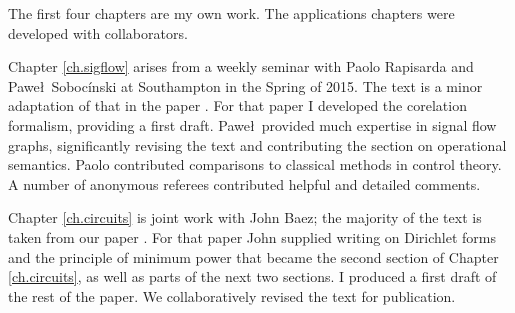 The first four chapters are my own work. The applications chapters were
developed with collaborators. 

Chapter \ref{ch.sigflow} arises from a weekly seminar with Paolo Rapisarda and
Pawe\l\ Soboc\'inski at Southampton in the Spring of 2015. The text is a minor
adaptation of that in the paper \cite{FRS16}. For that paper I developed the
corelation formalism, providing a first draft. Pawe\l\ provided much expertise
in signal flow graphs, significantly revising the text and contributing the
section on operational semantics. Paolo contributed comparisons to classical
methods in control theory.  A number of anonymous referees contributed helpful
and detailed comments.

Chapter \ref{ch.circuits} is joint work with John Baez; the majority of the text
is taken from our paper \cite{BF}. For that paper John supplied writing on
Dirichlet forms and the principle of minimum power that became the second
section of Chapter \ref{ch.circuits}, as well as parts of the next two sections.
I produced a first draft of the rest of the paper. We collaboratively revised
the text for publication.


%

